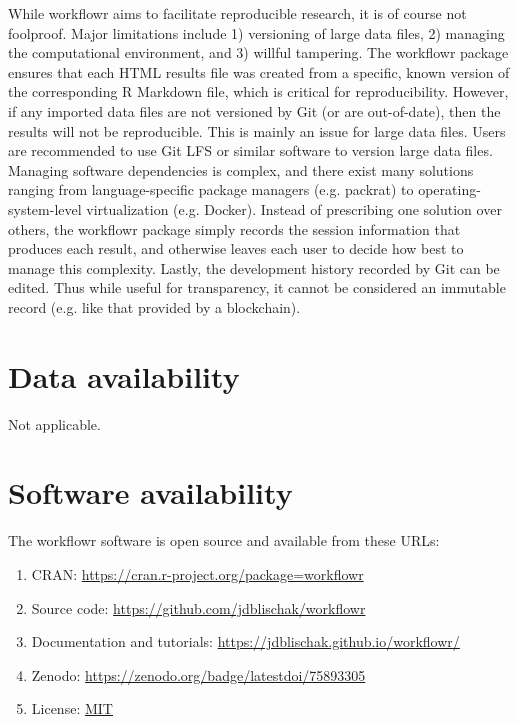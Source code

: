 \documentclass[9pt,a4paper]{extarticle}
\begin{document}
While workflowr aims to facilitate reproducible research, it is of
course not foolproof. Major limitations include 1) versioning of large
data files, 2) managing the computational environment, and 3) willful
tampering. The workflowr package ensures that each HTML results file was
created from a specific, known version of the corresponding R Markdown
file, which is critical for reproducibility. However, if any imported
data files are not versioned by Git (or are out-of-date), then the
results will not be reproducible. This is mainly an issue for large data
files. Users are recommended to use Git LFS or similar software to
version large data files. Managing software dependencies is complex, and
there exist many solutions ranging from language-specific package
managers (e.g. packrat) to operating-system-level virtualization (e.g.
Docker). Instead of prescribing one solution over others, the workflowr
package simply records the session information that produces each
result, and otherwise leaves each user to decide how best to manage this
complexity. Lastly, the development history recorded by Git can be
edited. Thus while useful for transparency, it cannot be considered an
immutable record (e.g. like that provided by a blockchain).


\section*{Data availability}

Not applicable.


\section*{Software availability}

The workflowr software is open source and available from these URLs:

\begin{enumerate}

\item CRAN: \url{https://cran.r-project.org/package=workflowr}

\item Source code: \url{https://github.com/jdblischak/workflowr}

\item Documentation and tutorials:
\url{https://jdblischak.github.io/workflowr/}

\item Zenodo: \url{https://zenodo.org/badge/latestdoi/75893305}

\item License: \href{https://choosealicense.com/licenses/mit}{MIT}

\end{enumerate}
\end{document}

